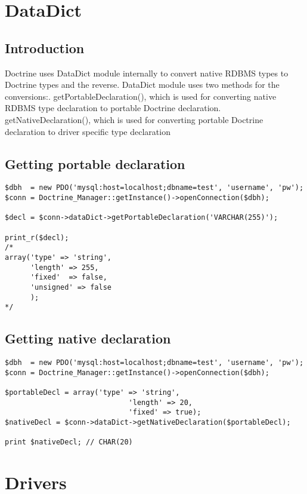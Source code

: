 \documentclass[11pt,a4paper]{report}
\begin{document}
\section{DataDict}
\subsection{Introduction}
Doctrine uses DataDict module internally to convert native RDBMS types to Doctrine types and the reverse. DataDict module uses two methods for the conversions:. getPortableDeclaration(), which is used for converting native RDBMS type declaration to portable Doctrine declaration. getNativeDeclaration(), which is used for converting portable Doctrine declaration to driver specific type declaration

\subsection{Getting portable declaration}
\begin{verbatim}
$dbh  = new PDO('mysql:host=localhost;dbname=test', 'username', 'pw');
$conn = Doctrine_Manager::getInstance()->openConnection($dbh);

$decl = $conn->dataDict->getPortableDeclaration('VARCHAR(255)');

print_r($decl);
/*
array('type' => 'string',
      'length' => 255,
      'fixed'  => false,
      'unsigned' => false
      );
*/
\end{verbatim}

\subsection{Getting native declaration}
\begin{verbatim}
$dbh  = new PDO('mysql:host=localhost;dbname=test', 'username', 'pw');
$conn = Doctrine_Manager::getInstance()->openConnection($dbh);

$portableDecl = array('type' => 'string',
                             'length' => 20,
                             'fixed' => true);
$nativeDecl = $conn->dataDict->getNativeDeclaration($portableDecl);

print $nativeDecl; // CHAR(20)
\end{verbatim}

\section{Drivers}
\end{document}
